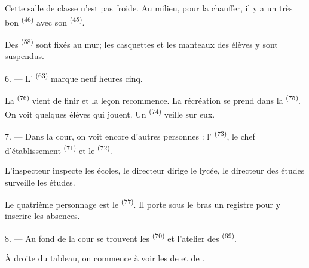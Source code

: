 Cette salle de classe n'est pas froide. Au milieu, pour la chauffer, il y a un
très bon  \textsuperscript{(46)} avec son 
\textsuperscript{(45)}.

Des  \textsuperscript{(58)} sont fixés au mur; les
casquettes et les manteaux des élèves y sont suspendus.

\VUsaut{5.2mm}
\VUsaut{3.6mm}

6. --- L' \textsuperscript{(63)} marque neuf heures cinq.

La  \textsuperscript{(76)} vient de finir et la leçon
recommence. La récréation se prend dans la 
\textsuperscript{(75)}. On voit quelques élèves qui jouent. Un
 \textsuperscript{(74)} veille sur eux.

7. --- Dans la cour, on voit encore d'autres personnes : l'
\textsuperscript{(73)}, le chef d'établissement 
\textsuperscript{(71)} et le 
\textsuperscript{(72)}.

L'inspecteur inspecte les écoles, le directeur dirige le lycée, le directeur
des études surveille les études.

Le quatrième personnage est le  \textsuperscript{(77)}. Il
porte sous le bras un registre pour y inscrire les absences.

8. --- Au fond de la cour se trouvent les 
\textsuperscript{(70)} et l'atelier des 
\textsuperscript{(69)}.

À droite du tableau, on commence à voir les  de
 et de .


\VUsaut{2.4mm}

